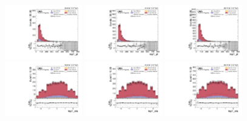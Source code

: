 \begin{figure}[!ht]
  \centering
  \includegraphics[width=0.30\textwidth]{analysis_plots/2016_zjj/cr_vjets_e/lep1_pt.pdf}
  \includegraphics[width=0.30\textwidth]{analysis_plots/2017_zjj/cr_vjets_e/lep1_pt.pdf}
  \includegraphics[width=0.30\textwidth]{analysis_plots/2018_zjj/cr_vjets_e/lep1_pt.pdf} \\
  \includegraphics[width=0.30\textwidth]{analysis_plots/2016_zjj/cr_vjets_e/lep1_eta.pdf}
  \includegraphics[width=0.30\textwidth]{analysis_plots/2017_zjj/cr_vjets_e/lep1_eta.pdf}
  \includegraphics[width=0.30\textwidth]{analysis_plots/2018_zjj/cr_vjets_e/lep1_eta.pdf} \\

\end{figure}
